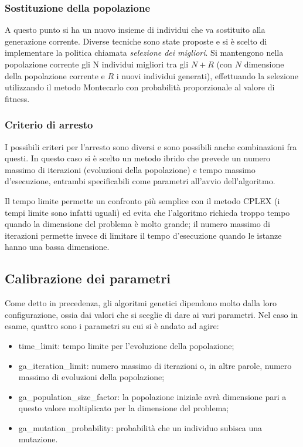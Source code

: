 \subsubsection{Sostituzione della popolazione}\label{subsubsec:sostituzione-popolazione}
A questo punto si ha un nuovo insieme di individui che va sostituito alla generazione corrente.
Diverse tecniche sono state proposte e si è scelto di implementare la politica chiamata \textit{selezione dei migliori}.
Si mantengono nella popolazione corrente gli N individui migliori tra gli $N + R$ (con $N$ dimensione della popolazione corrente
e $R$ i nuovi individui generati), effettuando la selezione utilizzando il metodo Montecarlo con probabilità
proporzionale al valore di fitness.
\subsubsection{Criterio di arresto}\label{subsubsec:criterio-arresto}
I possibili criteri per l'arresto sono diversi e sono possibili anche combinazioni fra questi.
In questo caso si è scelto un metodo ibrido che prevede un numero massimo di iterazioni (evoluzioni
della popolazione) e tempo massimo d'esecuzione, entrambi specificabili come parametri all'avvio dell'algoritmo.

Il tempo limite permette un confronto più semplice con il metodo CPLEX (i tempi limite sono infatti uguali)
ed evita che l'algoritmo richieda troppo tempo quando la dimensione del problema è molto grande;
il numero massimo di iterazioni permette invece di limitare il tempo d'esecuzione
quando le istanze hanno una bassa dimensione.
\subsection{Calibrazione dei parametri}\label{subsec:parametri}
Come detto in precedenza, gli algoritmi genetici dipendono molto dalla loro configurazione, ossia
dai valori che si sceglie di dare ai vari parametri.
Nel caso in esame, quattro sono i parametri su cui si è andato ad agire:
\begin{itemize}
	\item \textsf{time\_limit}: tempo limite per l'evoluzione della popolazione;
	\item \textsf{ga\_iteration\_limit}: numero massimo di iterazioni o, in altre parole, numero massimo di evoluzioni
	della popolazione;
	\item \textsf{ga\_population\_size\_factor}: la popolazione iniziale avrà dimensione pari a questo valore
	moltiplicato per la dimensione del problema;
	\item \textsf{ga\_mutation\_probability}: probabilità che un individuo subisca una mutazione.
\end{itemize}
%
